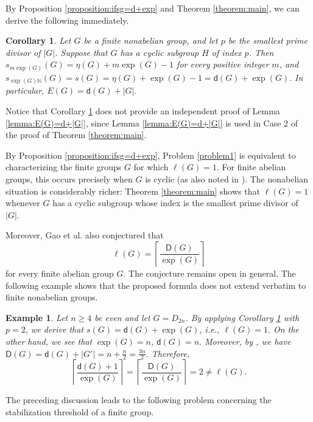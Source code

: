 \documentclass[a4paper, 12pt]{article}
\newtheorem{corollary}[theorem]{Corollary}
\newtheorem{example}[theorem]{Example}
\theoremstyle{definition}
\begin{document}
By Proposition \ref{proposition:ifsg=d+exp} and Theorem \ref{theorem:main}, we can derive the following immediately.

\begin{corollary}\label{corollary:generalized}
Let $G$ be a finite nonabelian group, and let $p$ be the smallest prime
divisor of $|G|$. Suppose that $G$ has a cyclic subgroup $H$ of index $p$.
Then $s_{m\exp(G)}(G)=\eta(G)+m\exp(G)-1$ for every positive integer $m$,
and $s_{\exp(G)\mathbb N}(G)=s(G)=\eta(G)+\exp(G)-1=\mathsf d(G)+\exp(G).$ In particular,
$E(G)=\mathsf d(G)+|G|.$
\end{corollary}

Notice that Corollary \ref{corollary:generalized} does not provide an
independent proof of Lemma \ref{lemma:E(G)=d+|G|}, since Lemma \ref{lemma:E(G)=d+|G|} is used in Case 2 of
the proof of Theorem \ref{theorem:main}.


By Proposition \ref{proposition:ifsg=d+exp}, Problem \ref{problem1}
is equivalent to characterizing the finite groups $G$ for which
$\ell(G)=1$. For finite abelian groups, this occurs precisely when
$G$ is cyclic (as also noted in \cite{GaoHanPengSun}). The nonabelian situation is considerably richer:
Theorem \ref{theorem:main} shows that $\ell(G)=1$ whenever $G$ has a
cyclic subgroup whose index is the smallest prime divisor of $|G|$.




Moreover, Gao et al. \cite[Conjecture 4.7]{GaoHanPengSun} also conjectured
that
$$
\ell(G)=\left\lceil\frac{\mathsf D(G)}{\exp(G)}\right\rceil
$$
for every finite abelian group $G$. The conjecture remains open in general. The following example shows that the proposed
formula does not extend verbatim to finite nonabelian groups.


\begin{example}\label{example:nonabelianell}
Let $n\geq4$ be even and let $G=D_{2n}$. By applying Corollary \ref{corollary:generalized} with $p=2$,  we derive that $s(G)=\mathsf d(G)+\exp(G)$, i.e.,
$\ell(G)=1.$ On the other hand, we see that
$\exp(G)=n$, $\mathsf d(G)=n.$ Moreover, by \cite[Theorem 1.1]{GG2013}, we have
$\mathsf D(G)=\mathsf d(G)+|G'|=n+\frac{n}{2}=\frac{3n}{2}.$ Therefore,
$$\left\lceil\frac{\mathsf d(G)+1}{\exp(G)}\right\rceil=\left\lceil\frac{\mathsf D(G)}{\exp(G)}\right\rceil
=2\neq\ell(G).$$
\end{example}

The preceding discussion leads to the following problem
concerning the stabilization threshold of a finite group.
\end{document}
